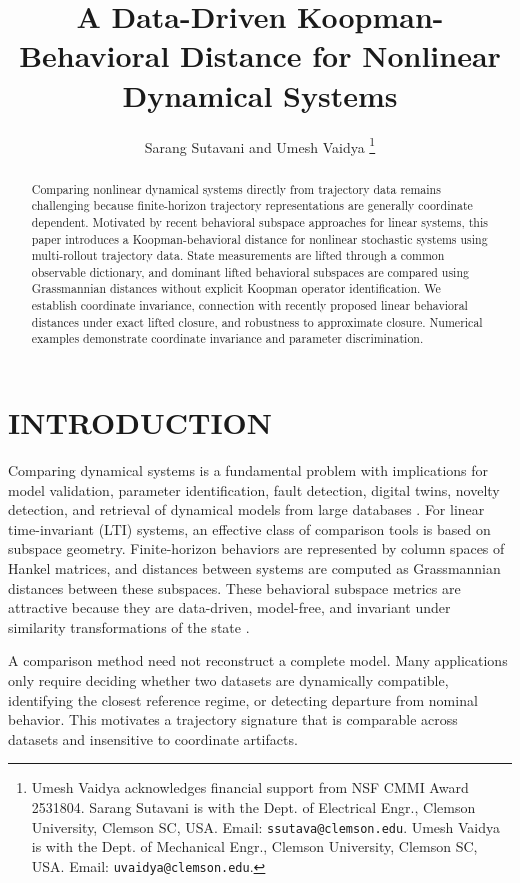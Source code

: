 \documentclass[letterpaper, 10 pt, conference]{ieeeconf}  %
\title{\LARGE \bf
A Data-Driven Koopman-Behavioral Distance for Nonlinear Dynamical Systems
}
\author{Sarang Sutavani and Umesh Vaidya%
\thanks{Umesh Vaidya acknowledges financial support from NSF CMMI Award 2531804. Sarang Sutavani is with the Dept. of Electrical Engr., Clemson University, Clemson SC, USA. Email: {\tt\small ssutava@clemson.edu}. 
Umesh Vaidya is with the Dept. of Mechanical Engr., Clemson University, Clemson SC, USA. Email: {\tt\small uvaidya@clemson.edu}.}%
}
\begin{document}
\maketitle
\thispagestyle{empty}
\pagestyle{empty}


\begin{abstract}

Comparing nonlinear dynamical systems directly from trajectory data remains challenging because finite-horizon trajectory representations are generally coordinate dependent. Motivated by recent behavioral subspace approaches for linear systems, this paper introduces a Koopman-behavioral distance for nonlinear stochastic systems using multi-rollout trajectory data. State measurements are lifted through a common observable dictionary, and dominant lifted behavioral subspaces are compared using Grassmannian distances without explicit Koopman operator identification. We establish coordinate invariance, connection with recently proposed linear behavioral distances under exact lifted closure, and robustness to approximate closure. Numerical examples demonstrate coordinate invariance and parameter discrimination.

\end{abstract}


\section{INTRODUCTION}

Comparing dynamical systems is a fundamental problem with implications for model validation, parameter identification, fault detection, digital twins, novelty detection, and retrieval of dynamical models from large databases \cite{mezic2004comparison,mehta2005stochastic,yu2009kullback,vaidya2005comparison}. For linear time-invariant (LTI) systems, an effective class of comparison tools is based on subspace geometry. Finite-horizon behaviors are represented by column spaces of Hankel matrices, and distances between systems are computed as Grassmannian distances between these subspaces. These behavioral subspace metrics are attractive because they are data-driven, model-free, and invariant under similarity transformations of the state \cite{willems2005fundamental,markovsky2021behavioral,padoan2025distances}.

A comparison method need not reconstruct a complete model. Many applications only require deciding whether two datasets are dynamically compatible, identifying the closest reference regime, or detecting departure from nominal behavior. This motivates a trajectory signature that is comparable across datasets and insensitive to coordinate artifacts.
\end{document}
